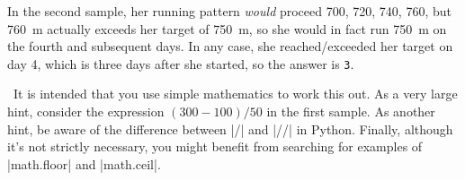 In the second sample, her running pattern \emph{would} proceed 700, 720, 740, 760, but
\SI{760}{\m} actually exceeds her target of \SI{750}{\m}, so she would in fact run
\SI{750}{\m} on the fourth and subsequent days. In any case, she reached/exceeded her
target on day 4, which is three days after she started, so the answer is \texttt{3}.

\Scratch\ It is intended that you use simple mathematics to work this out. As a very large
hint, consider the expression $(300 - 100)/50$ in the first sample. As another hint, be
aware of the difference between \pycode|/| and \pycode|//| in Python. Finally, although
it's not strictly necessary, you might benefit from searching for examples of
\pycode|math.floor| and \pycode|math.ceil|.

